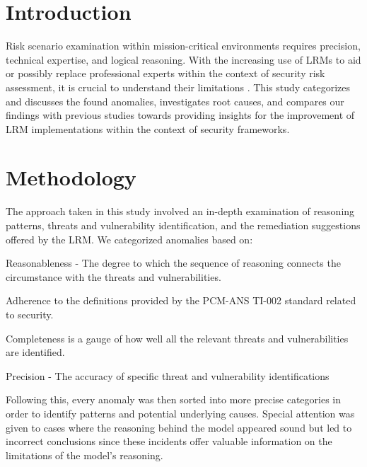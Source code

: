 \documentclass[sigconf]{acmart}
\begin{document}
\maketitle

\section{Introduction}
Risk scenario examination within mission-critical environments requires precision, technical expertise, and logical reasoning. With the increasing use of LRMs to aid or possibly replace professional experts within the context of security risk assessment, it is crucial to understand their limitations \citep{esposito2024beyond}. This study categorizes and discusses the found anomalies, investigates root causes, and compares our findings with previous studies towards providing insights for the improvement of LRM implementations within the context of security frameworks.

\section{Methodology}
The approach taken in this study involved an in-depth examination of reasoning patterns, threats and vulnerability identification, and the remediation suggestions offered by the LRM. We categorized anomalies based on: 
 
Reasonableness - The degree to which the sequence of reasoning connects the circumstance with the threats and vulnerabilities. 
 
Adherence to the definitions provided by the PCM-ANS TI-002 standard related to security.

Completeness is a gauge of how well all the relevant threats and vulnerabilities are identified. 

Precision - The accuracy of specific threat and vulnerability identifications
 
Following this, every anomaly was then sorted into more precise categories in order to identify patterns and potential underlying causes. Special attention was given to cases where the reasoning behind the model appeared sound but led to incorrect conclusions since these incidents offer valuable information on the limitations of the model's reasoning.

\end{document}
